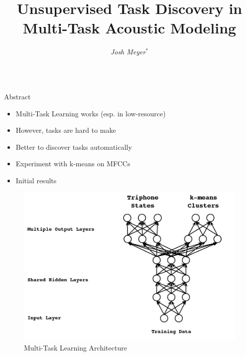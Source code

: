 \documentclass[final]{beamer} %
\title{Unsupervised Task Discovery in Multi-Task Acoustic Modeling}
\author{
  \textit{Josh Meyer}$^*$}
\institute{$*$ University of Arizona}
\newlength{\columnheight}
\begin{document}


\begin{frame}
  \begin{columns}
    \begin{column}{0.23\textwidth}
      \parbox[t][\columnheight]{.9\textwidth}{

        \vspace{1cm}
        
        \begin{block}{Abstract}
          \begin{itshape}   %
            \begin{itemize}
            \item Multi-Task Learning works (esp. in low-resource)
            \item However, tasks are hard to make
            \item Better to discover tasks automatically
            \item Experiment with k-means on MFCCs
            \item Initial results
            \end{itemize}
          \end{itshape}
        \end{block}

        \vfill
        
        \begin{figure}[!htbp]
          \centering
          \includegraphics[width=\linewidth]{figs/heigold-2013-dnn-c.png}
          \caption{Multi-Task Learning Architecture}
          \label{fig:mtl-dnn}
          \endminipage\hfill
        \end{figure}
        
}
\end{column}
\end{columns}
\end{frame}
\end{document}
